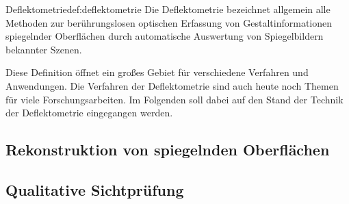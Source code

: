 \begin{Definition}{Deflektometrie}{def:deflektometrie}
	Die Deflektometrie bezeichnet allgemein alle Methoden zur berührungslosen optischen Erfassung von Gestaltinformationen spiegelnder Oberflächen durch automatische Auswertung von Spiegelbildern bekannter Szenen. \cite{fraunhofer}
\end{Definition}

\noindent
Diese Definition öffnet ein großes Gebiet für verschiedene Verfahren und Anwendungen.
Die Verfahren der Deflektometrie sind auch heute noch Themen für viele Forschungsarbeiten.
Im Folgenden soll dabei auf den Stand der Technik der Deflektometrie eingegangen werden.

{
	\FloatBarrier
    \subsection{Rekonstruktion von spiegelnden Oberflächen}
    \label{sub:rekonstruktion}
    
}

{
	\FloatBarrier
    \subsection{Qualitative Sichtprüfung}
    \label{sub:qualitativeSichtpruefung}
    
}
